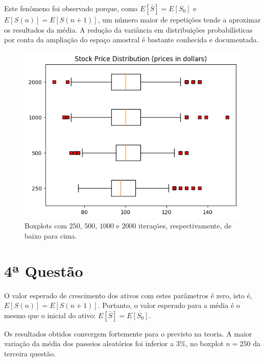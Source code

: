 \documentclass{article}
\begin{document}
Este fenômeno foi observado porque, como $E[\bar{S}] = E[S_{0}]$ e $E[S(n)] = E[S(n+1)]$, um número maior de repetições tende a aproximar os resultados da média.
A redução da variância em distribuições probabilísticas por conta da ampliação do espaço amostral é bastante conhecida e documentada. 

\begin{figure}[H]
	\includegraphics[width=\linewidth]{fig3_250.png}
	\centering
	
	\caption{Boxplots com $250$, $500$, $1000$ e $2000$ iterações, respectivamente, de baixo para cima.}
	\label{}
\end{figure}



\section*{4ª Questão}

O valor esperado de crescimento dos ativos com estes parâmetros é zero, isto é, $E[S(n)] = E[S(n+1)]$.
Portanto, o valor esperado para a média é o mesmo que o inicial do ativo: $E[\bar{S}] = E[S_{0}]$.

Os resultados obtidos convergem fortemente para o previsto na teoria.
A maior variação da média dos passeios aleatórios foi inferior a 3\%, no boxplot $n = 250$ da terceira questão.

\end{document}
